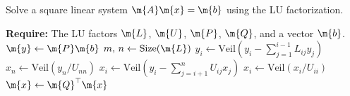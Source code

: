 \begin{breakablealgorithm}
  \caption{Solve a square linear system $\m{A}\m{x} = \m{b}$ using the \ac{LU} factorization.}
  \label{chap2:alg:solve_lu}
  \begin{algorithmic}[1]
    \State \textbf{Require:} The \ac{LU} factors $\m{L}$, $\m{U}$, $\m{P}$, $\m{Q}$, and a vector $\m{b}$.
     
    \State $\m{y} \gets \m{P}\m{b}$ 
    \State $m, \, n \gets \mathrm{Size}(\m{L})$ 
     
      \State $y_i \gets \mathrm{Veil}\left(y_i - \displaystyle\sum_{j=1}^{i-1} L_{ij}y_j \right)$ 
    \EndFor
    \State $x_n \gets \mathrm{Veil}(y_n/U_{nn})$ 
     
      \State $x_i \gets \mathrm{Veil}\left(y_i - {\displaystyle\sum_{j=i+1}^{n}} U_{ij}x_j\right)$ 
      \State $x_i \gets \mathrm{Veil}(x_i/U_{ii})$
    \EndFor
    \State $\m{x} \gets \m{Q}^\top\m{x}$ 
    \EndProcedure
  \end{algorithmic}
\end{breakablealgorithm}

